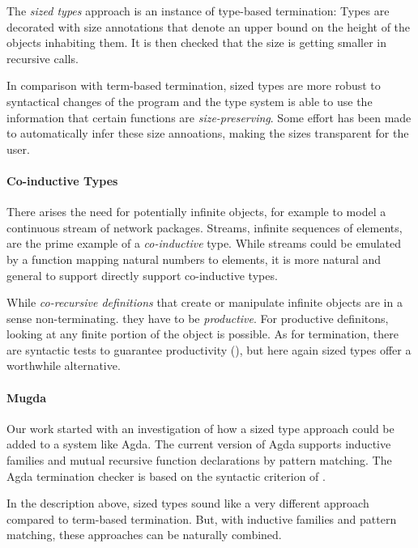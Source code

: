 The \emph{sized types} approach is an instance of type-based termination:
Types are decorated with size annotations that denote an upper bound on the height of the objects inhabiting them. 
It is then checked that the size is getting smaller in recursive calls. 

In comparison with term-based termination, sized types are more robust to syntactical changes of the program and the type system is able to use the information that certain functions are \emph{size-preserving}.
Some effort \cite{barthe} has been made to automatically infer these size annoations, making the sizes transparent for the user. 
\paragraph{Co-inductive Types}
There arises the need for potentially infinite objects, for example to model a continuous stream of network packages.
Streams, infinite sequences of elements, are the prime example of a \emph{co-inductive} type. 
While streams could be emulated by a function mapping natural numbers to elements, it is more 
natural and general to support directly support co-inductive types.

While \emph{co-recursive definitions} that create or manipulate infinite objects are in a sense non-terminating. 
they have to be \emph{productive}. For productive definitons, looking at any finite portion of the object is possible.
As for termination, there are syntactic tests to guarantee productivity (\cite{coquand-infinite}), but here again sized types offer a worthwhile alternative.  

\paragraph*{Mugda}
Our work started with an investigation of how a sized type approach could be added to a system like Agda.
The current version of Agda supports inductive families and mutual recursive function declarations by pattern matching. 
The Agda termination checker is based on the syntactic criterion of \cite{abel-altenkirch}.

In the description above, sized types sound like a very different approach compared to term-based termination.
But, with inductive families and pattern matching, these approaches can be naturally combined.

